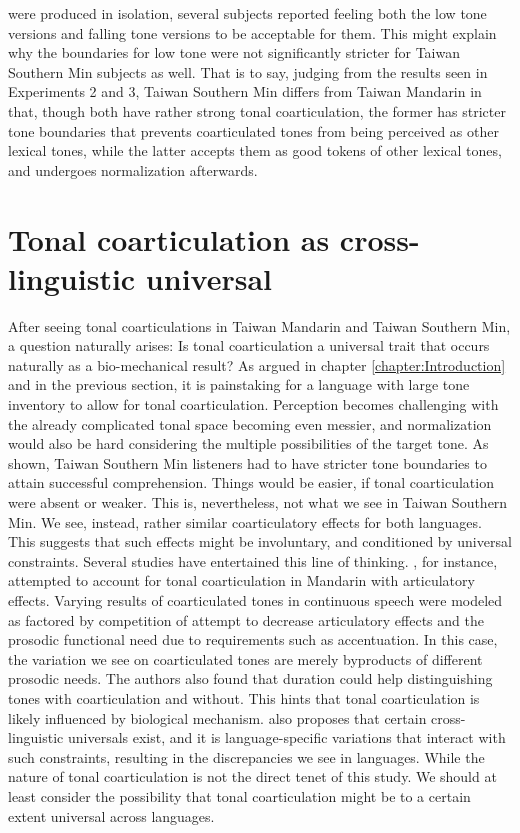 \documentclass[12pt]{report}
\begin{document}
\begin{CJK}{UTF8}{bsmi}
were produced in isolation, several subjects reported feeling both the low tone versions and falling tone versions to be acceptable for them. This might explain why the boundaries for low tone were not significantly stricter for Taiwan Southern Min subjects as well. That is to say, judging from the results seen in Experiments 2 and 3, Taiwan Southern Min differs from Taiwan Mandarin in that, though both have rather strong tonal coarticulation, the former has stricter tone boundaries that prevents coarticulated tones from being perceived as other lexical tones, while the latter accepts them as good tokens of other lexical tones, and undergoes normalization afterwards.

\section{Tonal coarticulation as cross-linguistic universal}
After seeing tonal coarticulations in Taiwan Mandarin and Taiwan Southern Min, a question naturally arises: Is tonal coarticulation a universal trait that occurs naturally as a bio-mechanical result? As argued in chapter \ref{chapter:Introduction} and in the previous section, it is painstaking for a language with large tone inventory to allow for tonal coarticulation. Perception becomes challenging with the already complicated tonal space becoming even messier, and normalization would also be hard considering the multiple possibilities of the target tone. As shown, Taiwan Southern Min listeners had to have stricter tone boundaries to attain successful comprehension. Things would be easier, if tonal coarticulation were absent or weaker. This is, nevertheless, not what we see in Taiwan Southern Min. We see, instead, rather similar coarticulatory effects for both languages. This suggests that such effects might be involuntary, and conditioned by universal constraints. Several studies have entertained this line of thinking. \cite{Haoetal2018}, for instance, attempted to account for tonal coarticulation in Mandarin with articulatory effects. Varying results of coarticulated tones in continuous speech were modeled as factored by competition of attempt to decrease articulatory effects and the prosodic functional need due to requirements such as accentuation. In this case, the variation we see on coarticulated tones are merely byproducts of different prosodic needs. The authors also found that duration could help distinguishing tones with coarticulation and without. This hints that tonal coarticulation is likely influenced by biological mechanism. \cite{Flemming2011} also proposes that certain cross-linguistic universals exist, and it is language-specific variations that interact with such constraints, resulting in the discrepancies we see in languages. While the nature of tonal coarticulation is not the direct tenet of this study. We should at least consider the possibility that tonal coarticulation might be to a certain extent universal across languages.


\end{CJK}
\end{document}
